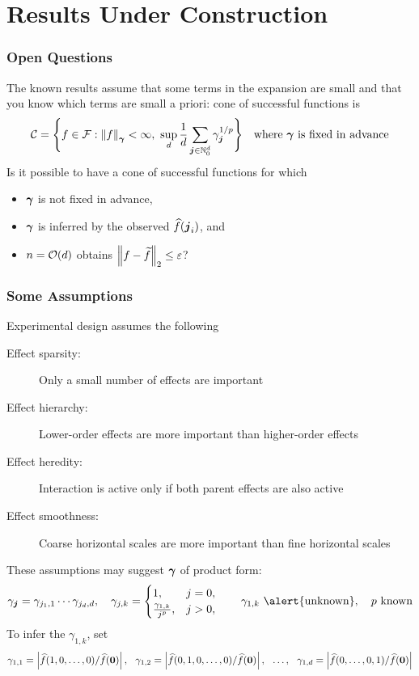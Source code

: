 \documentclass[11pt,compress,xcolor={usenames,dvipsnames},aspectratio=169]{beamer}
\begin{document}
\section{Results Under Construction}

\begin{frame}
\frametitle{Open Questions}
The known results assume that some terms in the expansion are small and that \alert{you know which terms are small a priori}:  cone of successful functions is 
\[
\cc = \Biggl \{f \in \cf : \norm[\vgamma]{f} < \infty,  \ \sup_d \frac 1d  \sum_{\vj \in \natzero^d} \gamma_{\vj}^{1/p} \Biggr \} \quad \text{where $\vgamma$ is fixed in advance}
\]
Is it possible to have a cone of successful functions for which 
\begin{itemize}
	\item $\vgamma$ is not fixed in advance,
	\item $\vgamma$ is inferred by the observed $\hf(\vj_i)$, and 
	\item $n = \Order(d)$ obtains $\norm[2]{f - \tf} \le \varepsilon$?
\end{itemize}
\end{frame}

\begin{frame}
\frametitle{Some Assumptions}

\vspace{-3ex}

Experimental design assumes the following

\vspace{-3ex}
\begin{description}
	\item[Effect sparsity:] Only a small number of effects are important
	\item[Effect hierarchy:] Lower-order effects are more important than higher-order effects
	\item[Effect heredity:] Interaction is active only if both parent effects are also active
	\item[Effect smoothness:]  Coarse horizontal scales are more important than fine horizontal scales
\end{description}
\vspace{-3ex}
These assumptions may suggest $\vgamma$ of product form:
\[
\gamma_{\vj} = \gamma_{j_1,1} \cdots \gamma_{j_d,d},  \quad \gamma_{j,k} = \begin{cases}
1, & j = 0, \\
\frac{\gamma_{1,k}}{j^{p}}, & j > 0,
\end{cases}
\qquad \gamma_{1,k} \text{ \alert{unknown}}, \quad p \text{ known}
\]
To infer the  $\gamma_{1,k}$, set
\[ 
\gamma_{1,1}  = \abs{\hf(1, 0 , \ldots, 0)/\hf(\vzero)},  \ \  \gamma_{1,2}  = \abs{\hf(0, 1, 0 , \ldots, 0)/\hf(\vzero)}, \ \ \ldots, \ \  \gamma_{1,d}  = \abs{\hf( 0 , \ldots, 0,1)/\hf(\vzero)}
\]

\end{frame}
\end{document}
